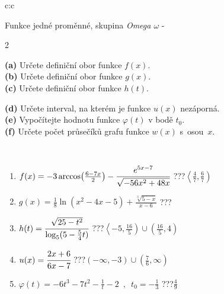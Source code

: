 \documentclass[10pt]{report}
\begin{document}
\begin{tabular}{c:c}
\begin{minipage}[c][104.5mm][t]{0.5\linewidth}
\begin{center}
\vspace{7mm}
{\huge Funkce jedné proměnné, skupina \textit{Omega $\omega$} -}\\[5mm]
\begin{minipage}{0.95\linewidth}
\begin{center}
{\small \begin{multicols}{2} \raggedright
\textbf{(a)} Určete definiční obor funkce \(f(x)\). \\[1mm]
\textbf{(b)} Určete definiční obor funkce \(g(x)\). \\[1mm]
\textbf{(c)} Určete definiční obor funkce \(h(t)\). \par \columnbreak
\textbf{(d)} Určete interval, na kterém je funkce \(u(x)\) nezáporná. \\[1mm]
\textbf{(e)} Vypočítejte hodnotu funkce \(\varphi(t)\) v bodě \(t_0\). \\[1mm]
\textbf{(f)} Určete počet průsečíků grafu funkce \(w(x)\) s~osou~\(x\). \\[1mm]
\end{multicols}
}
\end{center}
\end{minipage}
\\[4mm]
\begin{minipage}{0.79\linewidth}
\begin{center}
\begin{varwidth}{\linewidth}
\begin{enumerate}
\small
\item $f(x) = -3\arccos\!\left( \frac{6-7x}{2} \right) - \cfrac{e^{5x-7}}{\sqrt{-56x^2+48x}}$\quad \dotfill\; ???\;\dotfill \quad $\left\langle\frac{4}{7} , \frac{6}{7}\right)$
\item $g(x) = \frac{1}{8} \ln{\!(x^2-4x-5)}+\frac{\sqrt[3]{5-x}}{x-6}$\quad \dotfill\; ???\;\dotfill {}
\item $h(t) = \cfrac{\sqrt{25-t^2}}{\log_5(5-\frac{5}{4}t)}$\quad \dotfill\; ???\;\dotfill \quad $\left\langle-5 , \frac{16}{5}\right)\cup\left(\frac{16}{5} , 4\right)$
\item $u(x) = \cfrac{2x+6}{6x-7}$\quad \dotfill\; ???\;\dotfill \quad $\left(-\infty , -3\right)\cup\left(\frac{7}{6} , \infty\right)$
\item $\varphi(t) = -6t^3-7t^2-\frac{1}{t}-2 \enspace , \enspace t_0=-\frac{1}{3}$\quad \dotfill\; ???\;\dotfill \quad $\frac{4}{9}$

\end{enumerate}
\end{varwidth}
\end{center}
\end{minipage}
\end{center}
\end{minipage}
\end{tabular}
\end{document}
